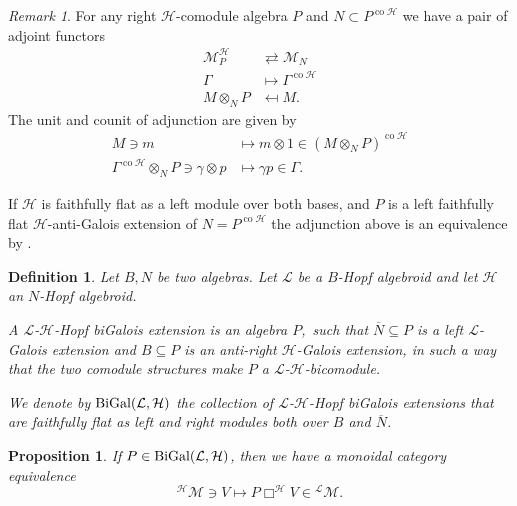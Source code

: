 \documentclass[a4paper,reqno]{amsart}
\numberwithin{equation}{section}
\theoremstyle{plain}
\newtheorem{prop}[thm]{Proposition}
\newtheorem{defi}[thm]{Definition}
\theoremstyle{remark}
\newtheorem{rem}[thm]{Remark}
\numberwithin{equation}{section}
\newcommand{\ot}{\otimes}
\newcommand\ol{\overline}
\newcommand{\Bi}{\textup{BiGal}}
\newcommand{\cL}{\mathcal{L}}
\newcommand\ou[1]{\otimes_{#1}}
\newcommand{\CH}{\mathcal{H}}
\newcommand\co{{\operatorname{co}}}
\newcommand\LComod[1]{{^{#1}}\mathcal M}
\newcommand\RMod[1]{\mathcal M_{#1}}
\begin{document}
\begin{rem}\label{hopf module adjunction}
    For any right $\CH$-comodule algebra $P$ and $N\subset P^{\co\CH}$ we have a pair of adjoint functors
    \begin{align*}
        \mathcal M^{\CH}_P&\rightleftarrows \RMod N\\
        \Gamma&\mapsto \Gamma^{\co\CH}\\
        M\ou NP&\mapsfrom M. 
    \end{align*}
    The unit and counit of adjunction are given by
    \begin{align*}
        M\ni m&\mapsto m\ot 1\in(M\ou NP)^{\co\CH}\\
        \Gamma^{\co\CH}\ou NP\ni \gamma\ot p&\mapsto \gamma p\in \Gamma.
    \end{align*}
   
    If $\CH$ is faithfully flat as a left module over both bases, and $P$ is a left faithfully flat $\CH$-anti-Galois extension of $N=P^{\co\CH}$ the adjunction above is an equivalence by \cite[Corollary 3.27]{HS25}.
\end{rem}





\begin{defi}\label{def. Hopf biGalois extensions}
    Let $B,N$ be two algebras. 
    Let $\cL$ be a $B$-Hopf algebroid  and let $\CH$ an $N$-Hopf algebroid. 
    
    A $\cL$-$\CH$-Hopf biGalois extension is an algebra $P$,\ such that $\ol N\subseteq P$ is a 
        left $\cL$-Galois extension and $B\subseteq P$ is an  anti-right $\CH$-Galois extension, in such a way that the two comodule structures make $P$ a $\cL$-$\CH$-bicomodule. 

    We denote by $\Bi(\cL, \CH)$ the collection of $\cL$-$\CH$-Hopf biGalois extensions that are faithfully flat as left and right modules both over $B$ and $\ol N$. 
\end{defi}


\begin{prop}\label{bigalois imply equivalence}
 If $P\in\Bi(\cL,\CH)$, then we have a monoidal category equivalence
    \[\LComod{\CH}\ni V\mapsto P\Box^{\CH}V\in\LComod{\cL}.\]
\end{prop}
\end{document}
